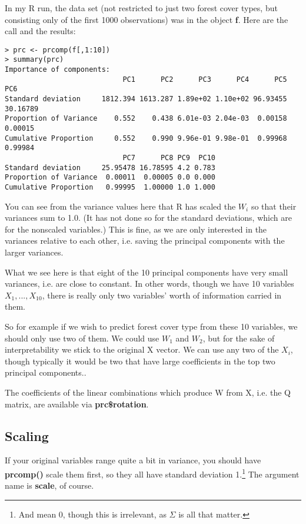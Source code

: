 In my R run, the data set (not restricted to just two forest cover
types, but consisting only of the first 1000 observations) was in the
object {\bf f}.  Here are the call and the results:

\begin{Verbatim}[fontsize=\relsize{-2}]
> prc <- prcomp(f[,1:10])
> summary(prc)
Importance of components:
                            PC1      PC2      PC3      PC4      PC5 PC6
Standard deviation     1812.394 1613.287 1.89e+02 1.10e+02 96.93455 30.16789
Proportion of Variance    0.552    0.438 6.01e-03 2.04e-03  0.00158 0.00015
Cumulative Proportion     0.552    0.990 9.96e-01 9.98e-01  0.99968 0.99984
                            PC7      PC8 PC9  PC10
Standard deviation     25.95478 16.78595 4.2 0.783
Proportion of Variance  0.00011  0.00005 0.0 0.000
Cumulative Proportion   0.99995  1.00000 1.0 1.000
\end{Verbatim}

You can see from the variance values here that R has scaled the $W_i$ so
that their variances sum to 1.0.  (It has not done so for the standard
deviations, which are for the nonscaled variables.) This is fine, as we
are only interested in the variances relative to each other, i.e. saving
the principal components with the larger variances.

What we see here is that eight of the 10 principal components have very
small variances, i.e. are close to constant.  In other words, though we
have 10 variables $X_1,...,X_{10}$, there is really only two
variables' worth of information carried in them.  

So for example if we wish to predict forest cover type from these 10
variables, we should only use two of them.  We could use $W_1$ and
$W_2$, but for the sake of interpretability we stick to the original X
vector.  We can use any two of the $X_i$, though typically it would be
two that have large coefficients in the top two principal components..

The coefficients of the linear combinations which produce W from X, i.e.
the Q matrix, are available via {\bf prc\$rotation}.


\subsection{Scaling}

If your original variables range quite a bit in variance, you should
have {\bf prcomp()} scale them first, so they all have standard
deviation 1.\footnote{And mean 0, though this is irrelevant, as $\Sigma$
is all that matter.}  The argument name is {\bf scale}, of course.

